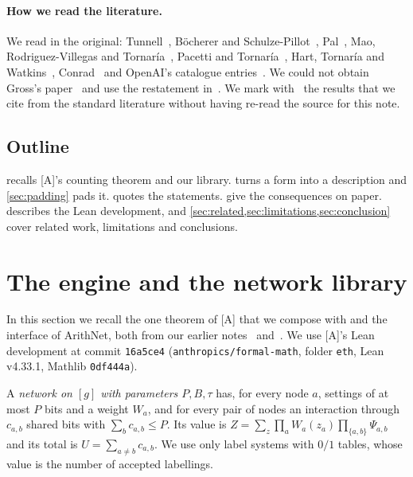 \documentclass[10pt]{amsart}
\theoremstyle{plain}
\theoremstyle{definition}
\theoremstyle{remark}
\numberwithin{equation}{section}
\newcommand{\A}{\textup{[A]}}
\newcommand{\nr}{\dag}%
\begin{document}
\paragraph{How we read the literature.} We read in the original: Tunnell~\cite{Tun83}, B\"ocherer and
Schulze-Pillot~\cite{BSP90}, Pal~\cite{Pal12}, Mao, Rodriguez-Villegas and Tornar\'ia~\cite{MRVT07},
Pacetti and Tornar\'ia~\cite{PT08}, Hart, Tornar\'ia and Watkins~\cite{HTW10}, Conrad~\cite{Con08} and
OpenAI's catalogue entries~\cite{OAI002,OAI006}. We could not obtain Gross's paper~\cite{Gro87} and use the
restatement in~\cite[(3.1)]{MRVT07}. We mark with~\nr{} the results that we cite from the standard
literature without having re-read the source for this note.

\subsection*{Outline}
 recalls \A's counting theorem and our library.  turns a form into a
description and \cref{sec:padding} pads it.  quotes the statements. 
give the consequences on paper.  describes the Lean development, and
\cref{sec:related,sec:limitations,sec:conclusion} cover related work, limitations and conclusions.

\section{The engine and the network library}\label{sec:engine}

In this section we recall the one theorem of \A{} that we compose with and the interface of ArithNet, both
from our earlier notes~\cite[\S2]{TulFac26} and~\cite[\S\S2--4]{TulCN26}. We use \A's Lean development at
commit \texttt{16a5ce4} (\texttt{anthropics/formal-math}, folder \texttt{eth}, Lean v4.33.1, Mathlib
\texttt{0df444a}).

A \emph{network on $[g]$ with parameters $P,B,\tau$} has, for every node $a$, settings of at most $P$ bits and
a weight $W_a$, and for every pair of nodes an interaction through $c_{a,b}$ shared bits with
$\sum_bc_{a,b}\le P$. Its value is $Z=\sum_z\prod_aW_a(z_a)\prod_{\{a,b\}}\Psi_{a,b}$ and its total is
$U=\sum_{a\ne b}c_{a,b}$. We use only label systems with $0/1$ tables, whose value is the number of
accepted labellings.
\end{document}
